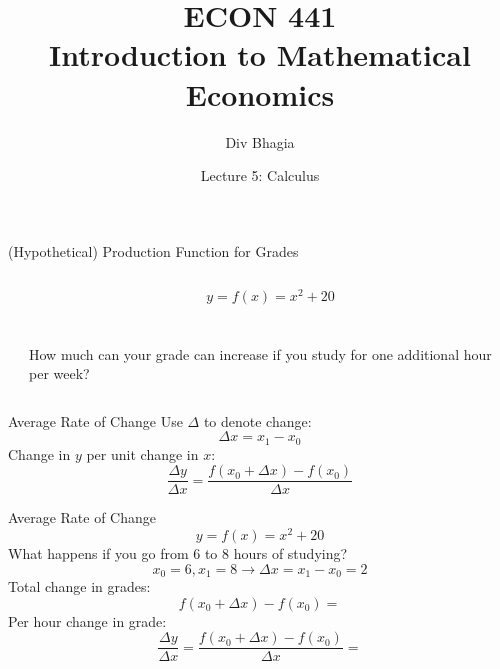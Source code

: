 \documentclass{./../../Latex/teaching_slides}
\begin{document}
\title{ECON 441 \\ \vspace{0.4em} \normalsize Introduction to Mathematical Economics}
\author{Div Bhagia}
\date{Lecture 5: Calculus}

\begin{frame}
\maketitle
\end{frame}

\begin{frame}{\large (Hypothetical) Production Function for Grades}
\begin{columns}[c]
\begin{column}{0.55\textwidth}
\end{column}
\begin{column}{0.45\textwidth}
$$y=f(x)=x^{2}+20$$ \\~\\
How much can your grade can increase if you study for one additional hour per week? \pause {}
\end{column}
\end{columns}
\end{frame}

\begin{frame}{Average Rate of Change}
Use $\Delta$ to denote change:
$$\Delta x=x_{1}-x_{0}$$
Change in $y$ per unit change in $x$:
$$ \frac{\Delta y}{\Delta x}=\frac{f\left(x_{0}+\Delta x\right)-f\left(x_{0}\right)}{\Delta x} $$
\end{frame}

\begin{frame}{Average Rate of Change}
\vspace{-1em}
$$y=f(x)=x^{2}+20$$ 
What happens if you go from 6 to 8 hours of studying? 
$$ x_0 = 6, x_1 = 8 \rightarrow   \Delta x = x_{1}-x_{0}=2 $$
Total change in grades:
$$ f(x_0+\Delta x) - f(x_0) =    $$ 
Per hour change in grade:
$$ \frac{\Delta y}{\Delta x}=\frac{f\left(x_{0}+\Delta x\right)-f\left(x_{0}\right)}{\Delta x} = $$
\end{frame}
\end{document}
